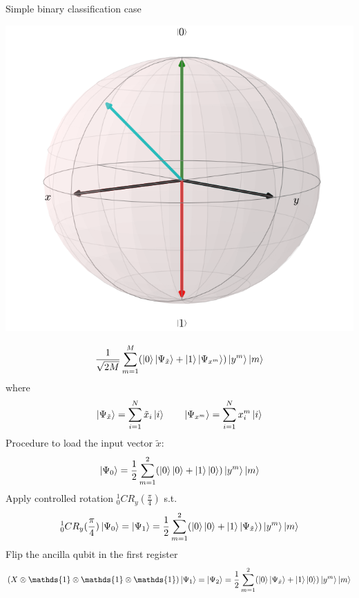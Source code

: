 \documentclass[10pt]{beamer}
\begin{document}
{
\begin{frame}{Simple binary classification case}

\begin{minipage}[c]{.4\textwidth}
		\hspace{-7mm}
       \includegraphics[width=\textwidth]{bloch3over4.png}
       \captionsetup{justification=raggedright, singlelinecheck=false}
\end{minipage}%
\begin{minipage}[c][][b]{.6\textwidth}
\scriptsize{
\begin{equation}
\frac{1}{\sqrt{2M}}\sum_{m=1}^{M} (\ket{0}\ket{\Psi_{\tilde{x}}}+\ket{1}\ket{\Psi_{x^{m}}})\ket{y^{m}}\ket{m}
\end{equation}
where
\begin{equation}
\ket{\Psi_{\tilde{x}}} = \sum_{i=1}^{N} \tilde{x}_i\ket{i} \quad \quad
\ket{\Psi_{x^{m}}} = \sum_{i=1}^{N} x_i^m \ket{i}
\end{equation}}
Procedure to load the input vector $\tilde{x}$:
\begin{equation}
\ket{\Psi_0} = \frac{1}{2}\sum_{m=1}^{2} (\ket{0}\ket{0}+\ket{1}\ket{0})\ket{y^{m}}\ket{m}
\end{equation}
Apply controlled rotation $_0^1CR_y(\frac{\pi}{4})$ s.t.
\begin{equation}
_0^1CR_y(\frac{\pi}{4})\ket{\Psi_0} = \ket{\Psi_1} = \frac{1}{2}\sum_{m=1}^{2} (\ket{0}\ket{0}+\ket{1}\ket{\Psi_{\tilde{x}}})\ket{y^{m}}\ket{m}
\end{equation}
Flip the ancilla qubit in the first register
\begin{equation}
(X\otimes\mathds{1}\otimes\mathds{1}\otimes\mathds{1})\ket{\Psi_1} = \ket{\Psi_2} = \frac{1}{2}\sum_{m=1}^{2} (\ket{0}\ket{\Psi_{\tilde{x}}}+\ket{1}\ket{0})\ket{y^{m}}\ket{m}
\end{equation}
\null
\par\xdef\tpd{\the\prevdepth}
\end{minipage}


\end{frame}}
\end{document}

